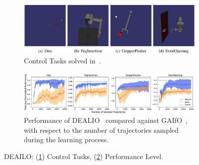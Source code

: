 \begin{figure}[t]
    \centering
    \begin{subfigure}[b]{0.8\textwidth}
        \centering
        \includegraphics[width=\textwidth]{Figures/images/dealio/dealio_performed_task.jpg}
        \caption{Control Tasks solved in~\cite{torabi2021dealio}.}
        \label{fig:dealio_task}
    \end{subfigure}
    \vfill
    \begin{subfigure}[b]{0.8\textwidth}
        \includegraphics[width=\textwidth]{Figures/images/dealio/dealio_performance.jpg}
        \caption{Performance of DEALIO~\cite{torabi2021dealio} compared against GAIfO~\cite{torabi2018gaifo}, with respect to the number of trajectories sampled during the learning process.}
        \label{fig:dealio_performance}
    \end{subfigure}
    \caption{DEAILO: (\ref{fig:dealio_task}) Control Tasks, (\ref{fig:dealio_performance}) Performance Level.}
    \label{fig:dealio}
\end{figure}
